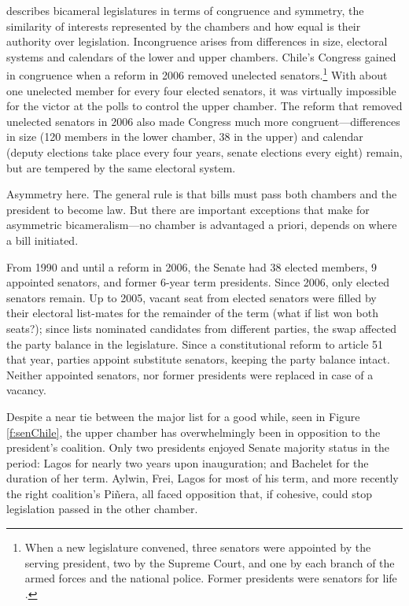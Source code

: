 \documentclass[letter,12pt]{article}
\begin{document}
\citet{lijphart.1984} describes bicameral legislatures in terms of congruence and symmetry, the similarity of interests represented by the chambers and how equal is their authority over legislation. Incongruence arises from differences in size, electoral systems and calendars of the lower and upper chambers. Chile's Congress gained in congruence when a reform in 2006 removed unelected senators.\footnote{When a new legislature convened, three senators were appointed by the serving president, two by the Supreme Court, and one by each branch of the armed forces and the national police. Former presidents were senators for life \citep{siavelis.2000,londregan.2000a}.} With about one unelected member for every four elected senators, it was virtually impossible for the victor at the polls to control the upper chamber. The reform that removed unelected senators in 2006 also made Congress much more congruent---differences in size (120 members in the lower chamber, 38 in the upper) and calendar (deputy elections take place every four years, senate elections every eight) remain, but are tempered by the same electoral system. 

Asymmetry here. The general rule is that bills must pass both chambers and the president to become law. But there are important exceptions that make for asymmetric bicameralism---no chamber is advantaged a priori, depends on where a bill initiated. 

From 1990 and until a reform in 2006, the Senate had 38 elected members, 9 appointed senators, and former 6-year term presidents. Since 2006, only elected senators remain. Up to 2005, vacant seat from elected senators were filled by their electoral list-mates for the remainder of the term (what if list won both seats?); since lists nominated candidates from different parties, the swap affected the party balance in the legislature. Since a constitutional reform to article 51 that year, parties appoint substitute senators, keeping the party balance intact. Neither appointed senators, nor former presidents were replaced in case of a vacancy. 

Despite a near tie between the major list for a good while, seen in Figure \ref{f:senChile}, the upper chamber has overwhelmingly been in opposition to the president's coalition. Only two presidents enjoyed Senate majority status in the period: Lagos for nearly two years upon inauguration; and Bachelet for the duration of her term. Aylwin, Frei, Lagos for most of his term, and more recently the right coalition's Piñera, all faced opposition that, if cohesive, could stop legislation passed in the other chamber.  
\end{document}
